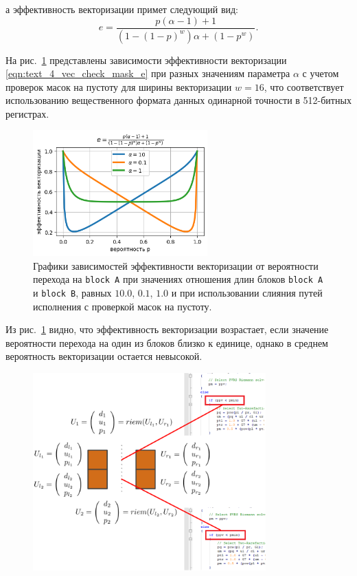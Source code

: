 а эффективность векторизации примет следующий вид:
\begin{equation}\label{eqn:text_4_vec_check_mask_e}
	e = \frac{ p(\alpha - 1) + 1 }{\left(1 - (1 - p)^w\right) \alpha + (1 - p^w) }.
\end{equation}

На рис.~\ref{fig:text_4_vec_check_mask_chart_e_merged} представлены зависимости эффективности векторизации \eqref{eqn:text_4_vec_check_mask_e} при разных значениям параметра $\alpha$ с учетом проверок масок на пустоту для ширины векторизации $w = 16$, что соответствует использованию вещественного формата данных одинарной точности в 512-битных регистрах.

\begin{figure}[ht]
	\centering
		\includegraphics[width=0.6\textwidth]{./pics/text_4_vec_check_mask/chart_e_merged.png}
	\caption{Графики зависимостей эффективности векторизации от вероятности перехода на \texttt{block A} при значениях отношения длин блоков \texttt{block A} и \texttt{block B}, равных $10.0$, $0.1$, $1.0$ и при использовании слияния путей исполнения с проверкой масок на пустоту.}
	\label{fig:text_4_vec_check_mask_chart_e_merged}
\end{figure}

Из рис.~\ref{fig:text_4_vec_check_mask_chart_e_merged} видно, что эффективность векторизации возрастает, если значение вероятности перехода на один из блоков близко к единице, однако в среднем вероятность векторизации остается невысокой.

\begin{figure}[ht]
\centering
\includegraphics[width=0.8\textwidth]{./pics/text_4_vec_check_mask/continuity.png}
\caption{}
\label{q}
\end{figure}

